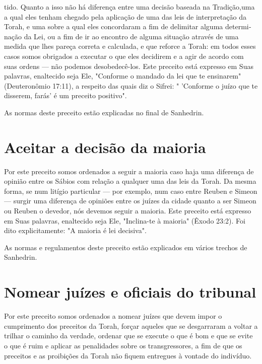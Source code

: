 \begin{itemize}
\begin{enumrate}
\begin{itemize}
\begin{itemize}
\begin{itemize}
tido. Quanto a isso não há diferença entre uma decisão baseada na
Tradição,uma a qual eles tenham chegado pela aplicação de uma das leis
de interpretação da Torah, e uma sobre a qual eles concordaram a fim de
delimitar alguma determi­nação da Lei, ou a fim de ir ao encontro de
alguma situação através de uma medida que lhes pareça correta e
calculada, e que reforce a Torah: em todos esses casos somos obrigados a
executar o que eles decidirem e a agir de acordo com suas ordens --- não
podemos desobedecê-los. Este preceito está expresso em Suas palavras,
enaltecido seja Ele, "Conforme o mandado da lei que te ensi­narem"
(Deuteronômio 17:11), a respeito das quais diz o Sifrei: " 'Conforme o
juízo que te disserem, farás' é um preceito positivo".


As normas deste preceito estão explicadas no final de Sanhedrin.


\section{Aceitar a decisão da maioria}

Por este preceito somos ordenados a seguir a maioria caso haja uma
diferença de opinião entre os Sábios com relação a qualquer uma das leis
da Torah. Da mesma forma, se num litígio particular --- por exemplo, num
caso entre Reuben e Simeon --- surgir uma diferença de opiniões entre os
juízes da cidade quanto a ser Simeon ou Reuben o devedor, nós devemos
seguir a maio­ria. Este preceito está expresso em Suas palavras,
enaltecido seja Ele, "Inclina-te à maioria" (Êxodo 23:2). Foi dito
explicitamente: "A maioria é lei decisiva".

As normas e regulamentos deste preceito estão explicados em vá­rios
trechos de Sanhedrin.

\section{Nomear juízes e oficiais do tribunal}

Por este preceito somos ordenados a nomear juízes que devem im­por o
cumprimento dos preceitos da Torah, forçar aqueles que se desgarraram a
voltar a trilhar o caminho da verdade, ordenar que se execute o que é
bom e que se evite o que é ruim e aplicar as penalidades sobre os
transgressores, a fim de que os preceitos e as proibições da Torah não
fiquem entregues à von­tade do indivíduo.


\end{itemize}
\end{itemize}
\end{itemize}
\end{enumrate}
\end{itemize}

